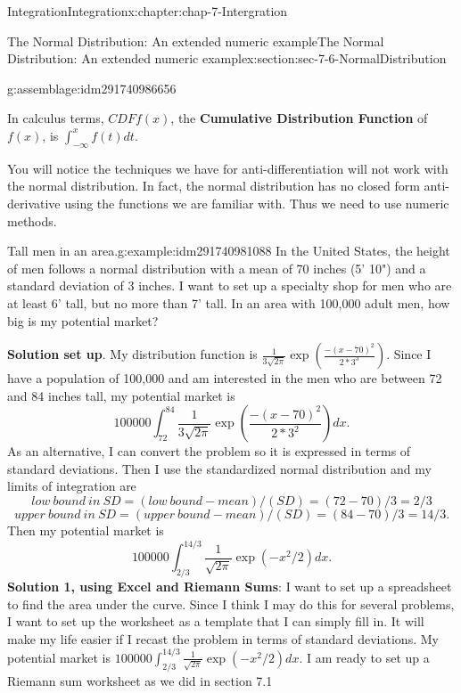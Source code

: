 \documentclass[oneside,10pt,]{book}
\newcommand{\terminology}[1]{\textbf{#1}}
\numberwithin{equation}{section}
\begin{document}
\begin{chapterptx}{Integration}{}{Integration}{}{}{x:chapter:chap-7-Intergration}
\begin{sectionptx}{The Normal Distribution: An extended numeric example}{}{The Normal Distribution: An extended numeric example}{}{}{x:section:sec-7-6-NormalDistribution}
\begin{assemblage}{}{g:assemblage:idm291740986656}
\par
In calculus terms,  \(CDFf(x)\), the \terminology{Cumulative Distribution Function} of  \(f(x)\), is  \(\int_{-\infty}^x f(t)dt\).%
\end{assemblage}
You will notice the techniques we have for anti-differentiation will not work with the normal distribution.  In fact, the normal distribution has no closed form anti-derivative using the functions we are familiar with.  Thus we need to use numeric methods.%
\begin{example}{Tall men in an area.}{g:example:idm291740981088}%
In the United States, the height of men follows a normal distribution with a mean of 70 inches (5' 10") and a standard deviation of 3 inches.  I want to set up a specialty shop for men who are at least 6’ tall, but no more than 7' tall.  In an area with 100,000 adult men, how big is my potential market?%
\par
\terminology{Solution set up}.  My distribution function is \(\frac{1}{3\sqrt{2\pi}}\exp\left(\frac{-(x-70)^2}{2*3^3}\right)\). Since I have a population of 100,000 and am interested in the men who are between 72 and 84 inches tall, my potential market is%
%
\begin{equation*}
100000\int_{72}^{84} \frac{1}{3\sqrt{2\pi}} \exp\left(\frac{-(x-70)^2}{2*3^2} \right)dx.
\end{equation*}
As an alternative, I can convert the problem so it is expressed in terms of standard deviations.  Then I use the standardized normal distribution and my limits of integration are%
%
\begin{equation*}
low\ bound\ in\ SD = (low\ bound-mean)/(SD) = (72-70)/3 = 2/3
\end{equation*}
%
\begin{equation*}
upper\ bound\ in\ SD = (upper\ bound-mean)/(SD) = (84-70)/3 = 14/3.
\end{equation*}
Then my potential market is%
%
\begin{equation*}
100000\int_{2/3}^{14/3} \frac{1}{\sqrt{2\pi}} \exp(-x^2/2)dx.
\end{equation*}
\terminology{Solution 1, using Excel and Riemann Sums}:  I want to set up a spreadsheet to find the area under the curve.  Since I think I may do this for several problems, I want to set up the worksheet as a template that I can simply fill in.  It will make my life easier if I recast the problem in terms of standard deviations.   My potential market is \(100000\int_{2/3}^{14/3} \frac{1}{\sqrt{2\pi}} \exp(-x^2/2)dx\).   I am ready to set up a Riemann sum worksheet as we did in section 7.1%

\end{example}
\end{sectionptx}
\end{chapterptx}
\end{document}
